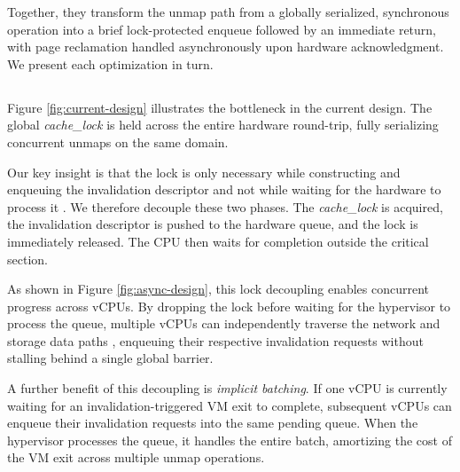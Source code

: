 Together, they transform the unmap path from a globally serialized, synchronous operation into a brief lock-protected enqueue followed by an immediate return, with page reclamation handled asynchronously upon hardware acknowledgment. We present each optimization in turn.


\subsection{\optOneHeading}

Figure \ref{fig:current-design} illustrates the bottleneck in the current design. The global \emph{cache\_lock} is held across the entire hardware round-trip, fully serializing concurrent unmaps on the same domain.

Our key insight is that the lock is only necessary while constructing and enqueuing the invalidation descriptor and not while waiting for the hardware to process it . We therefore decouple these two phases. The \emph{cache\_lock} is acquired, the invalidation descriptor is pushed to the hardware queue, and the lock is immediately released. The CPU then waits for completion outside the critical section.

As shown in Figure \ref{fig:async-design}, this lock decoupling enables concurrent progress across vCPUs. By dropping the lock before waiting for the hypervisor to process the queue, multiple vCPUs can independently traverse the network and storage data paths , enqueuing their respective invalidation requests without stalling behind a single global barrier. 

A further benefit of this decoupling is \emph{implicit batching}. If one vCPU is currently waiting for an invalidation-triggered VM exit to complete, subsequent vCPUs can enqueue their invalidation requests into the same pending queue. When the hypervisor processes the queue, it handles the entire batch, amortizing the cost of the VM exit across multiple unmap operations. 

